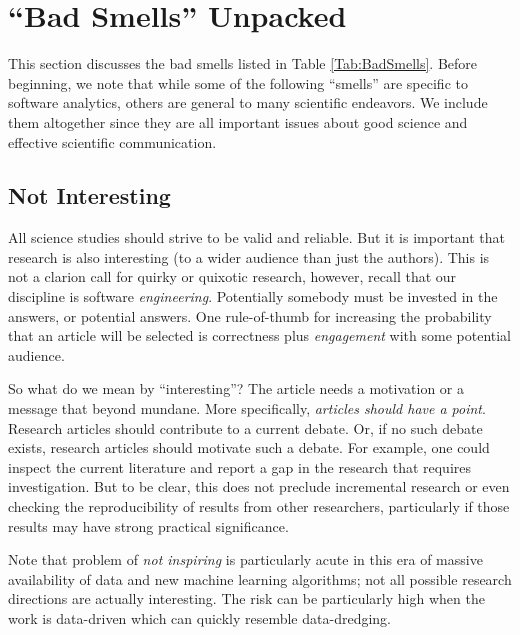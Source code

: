 \documentclass[preprint,10pt]{elsarticle}
\begin{document}
 
\section{``Bad Smells'' Unpacked}\label{Sec:BadSmells}
This section discusses the bad smells listed in Table \ref{Tab:BadSmells}.
Before beginning, we note that while some of the following ``smells'' are specific to software analytics, others are general to many scientific endeavors.  We include them altogether since they are all important issues about good science and effective scientific communication.


\subsection{Not Interesting}

All science studies should strive to be valid and reliable. But it is important that research is also interesting (to a wider audience than just the authors).  This is not a clarion call for quirky or quixotic research, however, recall that our discipline is software \textit{engineering}. Potentially somebody must be invested in the answers, or potential answers.  One rule-of-thumb for increasing the probability that an article will be selected is correctness plus {\em engagement} with some potential audience. 


So what do we mean by ``interesting''?  The article needs a motivation or a message that beyond mundane.  More specifically, {\em articles should have a point}. Research articles should contribute to a current debate. Or, if no such debate exists, research articles should motivate such a debate.  For example, one could inspect the current literature and report a gap in the research that requires investigation.  But to be clear, this does not preclude incremental research or even checking the reproducibility of results from other researchers, particularly if those results may have strong practical significance.

Note that problem of {\em not inspiring} is particularly acute in this era of massive availability of data and new machine learning algorithms; not all possible research directions are actually interesting.  The risk can be particularly high when the work is data-driven which can quickly resemble data-dredging.
\end{document}
